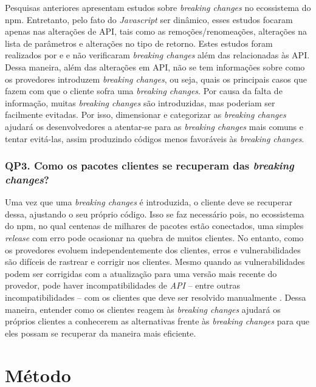 Pesquisas anteriores apresentam estudos sobre \textit{breaking changes} no ecossistema do \gls{npm}. Entretanto, pelo fato do \textit{Javascript} ser dinâmico, esses estudos focaram apenas nas alterações de \gls{API}, tais como as remoções/renomeações, alterações na lista de parâmetros e alterações no tipo de retorno. Estes estudos foram realizados por   e  e não verificaram \textit{breaking changes} além das relacionadas às \gls{API}. Dessa maneira, além das alterações em \gls{API}, não se tem informações sobre como os provedores introduzem \textit{breaking changes}, ou seja, quais os principais casos que fazem com que o cliente sofra uma \textit{breaking changes}. Por causa da falta de informação, muitas \textit{breaking changes} são introduzidas, mas poderiam ser facilmente evitadas. Por isso, dimensionar e categorizar as \textit{breaking changes} ajudará os desenvolvedores a atentar-se para as \textit{breaking changes} mais comuns e tentar evitá-las, assim produzindo códigos menos favoráveis às \textit{breaking changes}.

\subsubsection{QP3. Como os pacotes clientes se recuperam das \textit{breaking changes}?}

Uma vez que uma \textit{breaking changes} é introduzida, o cliente deve se recuperar dessa, ajustando o seu próprio código. Isso se faz necessário pois, no ecossistema do  \gls{npm}, no qual centenas de milhares de pacotes estão conectados, uma simples \textit{release} com erro pode ocasionar na quebra de muitos clientes. No entanto, como os provedores evoluem independentemente dos clientes, erros e vulnerabilidades são difíceis de rastrear e corrigir nos clientes. Mesmo quando as vulnerabilidades podem ser corrigidas com a atualização para uma versão mais recente do provedor, pode haver incompatibilidades de \textit{API} -- entre outras incompatibilidades -- com os clientes que deve ser resolvido manualmente \cite{Foo:2018:ESC:3236024.3275535}. Dessa maneira, entender como os clientes reagem às \textit{breaking changes} ajudará os próprios clientes a conhecerem as alternativas frente às \textit{breaking changes} para que eles possam se recuperar da maneira mais eficiente.

\section{Método}
\label{sec:metodo}


